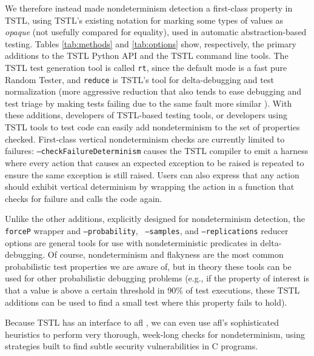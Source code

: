 We therefore instead made nondeterminism detection a first-class
property in TSTL, using TSTL's existing notation for marking some
types of values as \emph{opaque} (not usefully compared for equality),
used in automatic abstraction-based testing.  Tables \ref{tab:methods}
and \ref{tab:options} show, respectively, the primary additions to the
TSTL Python API and the TSTL command line tools.  The TSTL test
generation tool is called {\tt rt}, since the default mode is a fast
pure Random Tester, and {\tt reduce} is TSTL's tool for
delta-debugging and test
normalization (more aggressive reduction that also tends to ease
debugging and test triage by making tests failing due to the same
fault more similar \cite{onetest}).  With these additions,
developers of TSTL-based testing tools, or developers using TSTL tools
to test code can easily add nondeterminism to the set of properties
checked.  First-class vertical nondeterminism checks are currently
limited to failures:  {\tt --checkFailureDeterminism} causes the TSTL
compiler to emit a harness where every action that causes an expected
exception to be raised is repeated to ensure the same exception is
still raised.  Users can also express that any action should exhibit
vertical determinism by wrapping the action in a function that checks
for failure and calls the code again.

Unlike the other additions, explicitly designed for nondeterminism
detection, the {\tt forceP} wrapper and {\tt --probability}, {\tt
  --samples}, and {\tt --replications} reducer options are general
tools for use with nondeterministic predicates in delta-debugging.  Of
course, nondeterminism and flakyness are the most common probabilistic
test properties we are aware of, but in theory these tools can be used
for other probabilistic debugging problems (e.g., if the property of
interest is that a value is above a certain threshold in 90\% of test
executions, these TSTL additions can be used to find a small test where this property
fails to hold).

Because TSTL has an interface to afl \cite{aflfuzz}, we can even use
afl's sophisticated heuristics to perform very thorough, week-long
checks for nondeterminism, using strategies built to find subtle
security vulnerabilities in C programs.